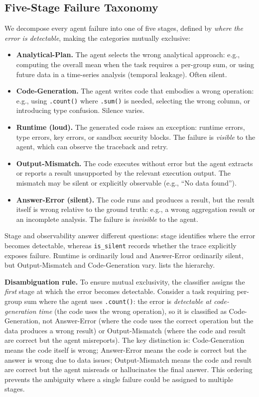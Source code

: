 \subsection{Five-Stage Failure Taxonomy}
\label{sec:taxonomy}

We decompose every agent failure into one of five stages, defined by \emph{where the error is detectable}, making the categories mutually exclusive:

\begin{itemize}[leftmargin=*,itemsep=2pt]
\item \textbf{Analytical-Plan.} The agent selects the wrong analytical approach: e.g., computing the overall mean when the task requires a per-group sum, or using future data in a time-series analysis (temporal leakage). Often silent.
\item \textbf{Code-Generation.} The agent writes code that embodies a wrong operation: e.g., using \texttt{.count()} where \texttt{.sum()} is needed, selecting the wrong column, or introducing type confusion. Silence varies.
\item \textbf{Runtime (loud).} The generated code raises an exception: runtime errors, type errors, key errors, or sandbox security blocks. The failure is \emph{visible} to the agent, which can observe the traceback and retry.
\item \textbf{Output-Mismatch.} The code executes without error but the agent extracts or reports a result unsupported by the relevant execution output. The mismatch may be silent or explicitly observable (e.g., ``No data found'').
\item \textbf{Answer-Error (silent).} The code runs and produces a result, but the result itself is wrong relative to the ground truth: e.g., a wrong aggregation result or an incomplete analysis. The failure is \emph{invisible} to the agent.
\end{itemize}

Stage and observability answer different questions: stage identifies where the error becomes detectable, whereas \texttt{is\_silent} records whether the trace explicitly exposes failure. Runtime is ordinarily loud and Answer-Error ordinarily silent, but Output-Mismatch and Code-Generation vary.  lists the hierarchy.

\textbf{Disambiguation rule.} To ensure mutual exclusivity, the classifier assigns the \emph{first} stage at which the error becomes detectable. Consider a task requiring per-group sum where the agent uses \texttt{.count()}: the error is \emph{detectable at code-generation time} (the code uses the wrong operation), so it is classified as Code-Generation, not Answer-Error (where the code uses the correct operation but the data produces a wrong result) or Output-Mismatch (where the code and result are correct but the agent misreports). The key distinction is: Code-Generation means the code itself is wrong; Answer-Error means the code is correct but the answer is wrong due to data issues; Output-Mismatch means the code and result are correct but the agent misreads or hallucinates the final answer. This ordering prevents the ambiguity where a single failure could be assigned to multiple stages.

